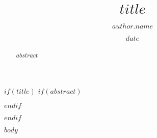 \documentclass[sigplan, screen, review]{acmart}
\title{$title$}
\author{$author.name$}
\affiliation{$author.affiliation$}
\date{$date$}
\begin{document}
$if(title)$
$if(abstract)$
\begin{abstract}
$abstract$
\end{abstract}
$endif$
\maketitle
$endif$

$body$
\end{document}
